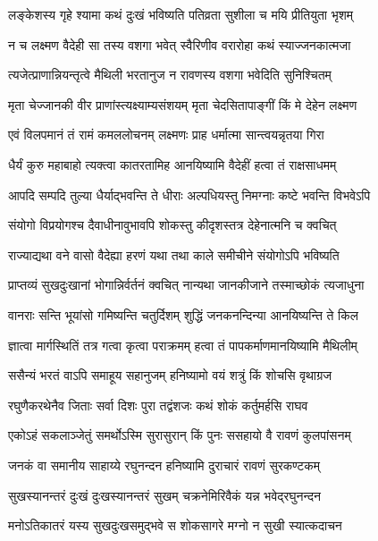 \twolineshloka
{लङ्केशस्य गृहे श्यामा कथं दुःखं भविष्यति}
{पतिव्रता सुशीला च मयि प्रीतियुता भृशम्}%

\twolineshloka
{न च लक्ष्मण वैदेही सा तस्य वशगा भवेत्}
{स्वैरिणीव वरारोहा कथं स्याज्जनकात्मजा}%

\twolineshloka
{त्यजेत्प्राणान्नियन्तृत्वे मैथिली भरतानुज}
{न रावणस्य वशगा भवेदिति सुनिश्चितम्}%

\twolineshloka
{मृता चेज्जानकी वीर प्राणांस्त्यक्ष्याम्यसंशयम्}
{मृता चेदसितापाङ्गीं किं मे देहेन लक्ष्मण}%

\twolineshloka
{एवं विलपमानं तं रामं कमललोचनम्}
{लक्ष्मणः प्राह धर्मात्मा सान्त्वयन्नृतया गिरा}%

\twolineshloka
{धैर्यं कुरु महाबाहो त्यक्त्वा कातरतामिह}
{आनयिष्यामि वैदेहीं हत्वा तं राक्षसाधमम्}%

\twolineshloka
{आपदि सम्पदि तुल्या धैर्याद्‌भवन्ति ते धीराः}
{अल्पधियस्तु निमग्नाः कष्टे भवन्ति विभवेऽपि}%

\twolineshloka
{संयोगो विप्रयोगश्च दैवाधीनावुभावपि}
{शोकस्तु कीदृशस्तत्र देहेनात्मनि च क्वचित्}%

\twolineshloka
{राज्याद्यथा वने वासो वैदेह्या हरणं यथा}
{तथा काले समीचीने संयोगोऽपि भविष्यति}%

\twolineshloka
{प्राप्तव्यं सुखदुःखानां भोगान्निर्वर्तनं क्वचित्}
{नान्यथा जानकीजाने तस्माच्छोकं त्यजाधुना}%

\twolineshloka
{वानराः सन्ति भूयांसो गमिष्यन्ति चतुर्दिशम्}
{शुद्धिं जनकनन्दिन्या आनयिष्यन्ति ते किल}%

\twolineshloka
{ज्ञात्वा मार्गस्थितिं तत्र गत्वा कृत्वा पराक्रमम्}
{हत्वा तं पापकर्माणमानयिष्यामि मैथिलीम्}%

\twolineshloka
{ससैन्यं भरतं वाऽपि समाहूय सहानुजम्}
{हनिष्यामो वयं शत्रुं किं शोचसि वृथाग्रज}%

\twolineshloka
{रघुणैकरथेनैव जिताः सर्वा दिशः पुरा}
{तद्वंशजः कथं शोकं कर्तुमर्हसि राघव}%

\twolineshloka
{एकोऽहं सकलाञ्जेतुं समर्थोऽस्मि सुरासुरान्}
{किं पुनः ससहायो वै रावणं कुलपांसनम्}%

\twolineshloka
{जनकं वा समानीय साहाय्ये रघुनन्दन}
{हनिष्यामि दुराचारं रावणं सुरकण्टकम्}%

\twolineshloka
{सुखस्यानन्तरं दुःखं दुःखस्यानन्तरं सुखम्}
{चक्रनेमिरिवैकं यन्न भवेद्‌रघुनन्दन}%

\twolineshloka
{मनोऽतिकातरं यस्य सुखदुःखसमुद्‌भवे}
{स शोकसागरे मग्नो न सुखी स्यात्कदाचन}%

